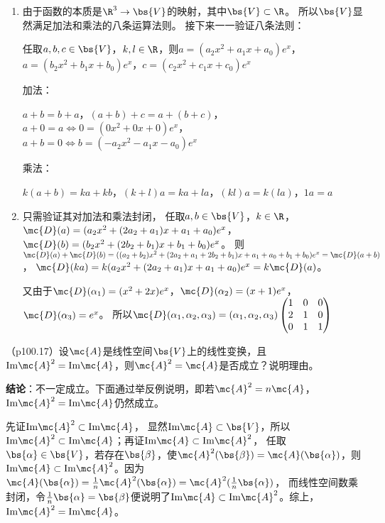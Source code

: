 \documentclass[12pt, a4paper, oneside, UTF8]{ctexbook}
\begin{document}
\begin{solution}
    \begin{enumerate}[label=(\arabic*)]
        \item 由于函数的本质是$\R^3 \to \bs{V}$的映射，其中$\bs{V} \subset \R$。
        所以$\bs{V}$显然满足加法和乘法的八条运算法则。
        接下来一一验证八条法则：

        任取$a,b,c \in \bs{V}$，$k,l \in \R$，则$a=(a_2x^2+a_1x+a_0)e^x$，$a=(b_2x^2+b_1x+b_0)e^x$，$c=(c_2x^2+c_1x+c_0)e^x$
        
        加法：

        $a+b=b+a$，$(a+b)+c=a+(b+c)$，$a+0=a \Leftrightarrow 0=(0x^2+0x+0)e^x$，
        $a+b=0 \Leftrightarrow b=(-a_2x^2-a_1x-a_0)e^x$
        
        乘法：

        $k(a+b)=ka+kb$，$(k+l)a=ka+la$，$(kl)a=k(la)$，$1a=a$
        
        \item 只需验证其对加法和乘法封闭，
        任取$a,b \in \bs{V}$，$k \in \R$，
        $\mc{D}(a)=(a_2x^2+(2a_2+a_1)x+a_1+a_0)e^x$，$\mc{D}(b)=(b_2x^2+(2b_2+b_1)x+b_1+b_0)e^x$。
        则$\mc{D}(a)+\mc{D}(b)=((a_2+b_2)x^2+(2a_2+a_1+2b_2+b_1)x+a_1+a_0+b_1+b_0)e^x=\mc{D}(a+b)$，
        $\mc{D}(ka)=k(a_2x^2+(2a_2+a_1)x+a_1+a_0)e^x=k\mc{D}(a)$。

        又由于$\mc{D}(\alpha_1)=(x^2+2x)e^x$，$\mc{D}(\alpha_2)=(x+1)e^x$，$\mc{D}(\alpha_3)=e^x$。
        所以$\mc{D}(\alpha_1,\alpha_2,\alpha_3)=(\alpha_1,\alpha_2,\alpha_3)\begin{pmatrix}
            1 & 0 & 0\\
            2 & 1 & 0 \\
            0 & 1 & 1
        \end{pmatrix}$
    \end{enumerate}
\end{solution}

\begin{question}
（p100.17）设$\mc{A}$是线性空间$\bs{V}$上的线性变换，且$\mathrm{Im} \mc{A}^2=\mathrm{Im} \mc{A}$，则$\mc{A}^2=\mc{A}$是否成立？说明理由。
\end{question}

\begin{solution}
\textbf{结论}：不一定成立。下面通过举反例说明，即若$\mc{A}^2=n\mc{A}$，$\mathrm{Im}\mc{A}^2=\mathrm{Im}\mc{A}$仍然成立。

先证$\mathrm{Im}\mc{A}^2 \subset \mathrm{Im}\mc{A}$，
显然$\mathrm{Im}\mc{A} \subset \bs{V}$，所以$\mathrm{Im}\mc{A}^2 \subset \mathrm{Im}\mc{A}$；再证$\mathrm{Im}\mc{A} \subset \mathrm{Im}\mc{A}^2$，
任取$\bs{\alpha} \in \bs{V}$，若存在$\bs{\beta}$，使$\mc{A}^2(\bs{\beta})=\mc{A}(\bs{\alpha})$，则$\mathrm{Im}\mc{A} \subset \mathrm{Im}\mc{A}^2$。因为$\mc{A}(\bs{\alpha})=\frac{1}{n}\mc{A}^2(\bs{\alpha})=\mc{A}^2(\frac{1}{n}\bs{\alpha})$，
而线性空间数乘封闭，令$\frac{1}{n}\bs{\alpha}=\bs{\beta}$便说明了$\mathrm{Im}\mc{A} \subset \mathrm{Im}\mc{A}^2$。综上，$\mathrm{Im}\mc{A}^2=\mathrm{Im}\mc{A}$。
\end{solution}
\end{document}
